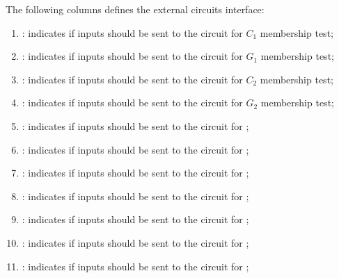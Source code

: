 The following columns defines the external circuits interface:
\begin{enumerate}[resume]
      \item \both{\csCOne}: indicates if inputs should be sent to the circuit for $C_1$ membership test;
      \item \both{\csGOne}: indicates if inputs should be sent to the circuit for $G_1$ membership test;
      \item \both{\csCTwo}: indicates if inputs should be sent to the circuit for $C_2$ membership test;
      \item \both{\csGTwo}: indicates if inputs should be sent to the circuit for $G_2$ membership test;
      \item \both{\csPairing}: indicates if inputs should be sent to the circuit for ;
      \item \both{\csGOneAdd}: indicates if inputs should be sent to the circuit for ;
      \item \both{\csGTwoAdd}: indicates if inputs should be sent to the circuit for ;
      \item \both{\csGOneMsm}: indicates if inputs should be sent to the circuit for ;
      \item \both{\csGTwoMsm}: indicates if inputs should be sent to the circuit for ;
      \item \both{\csMapFpToGOne}: indicates if inputs should be sent to the circuit for ;
      \item \both{\csMapFpTwoToGTwo}: indicates if inputs should be sent to the circuit for ;
\end{enumerate}
     
      
     